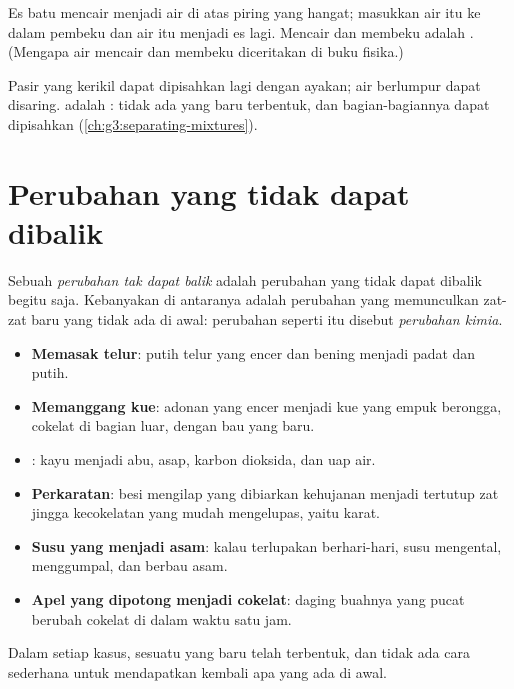 \begin{example}\label{ex:g5:irreversible-changes:ice}
Es batu mencair menjadi air di atas piring yang hangat; masukkan air itu
ke dalam pembeku dan air itu menjadi es lagi. Mencair dan membeku adalah
. (Mengapa air mencair dan membeku diceritakan di
buku fisika.)
\end{example}

\begin{example}[Mencampur]\label{ex:g5:irreversible-changes:mix}
Pasir yang  kerikil dapat dipisahkan lagi dengan ayakan; air
berlumpur dapat disaring.  adalah : tidak
ada yang baru terbentuk, dan bagian-bagiannya dapat dipisahkan
(\cref{ch:g3:separating-mixtures}).
\end{example}

\section{Perubahan yang tidak dapat dibalik}

\begin{definition}\label{def:g5:irreversible-changes:chemical-change}
Sebuah \emph{perubahan tak dapat balik}
adalah perubahan yang tidak dapat dibalik begitu saja. Kebanyakan di
antaranya adalah perubahan yang memunculkan zat-zat baru yang tidak ada
di awal: perubahan seperti itu disebut
\emph{perubahan kimia}.
\end{definition}

\begin{example}\label{ex:g5:irreversible-changes:six}
\begin{itemize}
  \item \textbf{Memasak telur}: putih telur yang encer dan bening
        menjadi padat dan putih.
  \item \textbf{Memanggang kue}: adonan yang encer menjadi kue yang
        empuk berongga, cokelat di bagian luar, dengan bau yang baru.
  \item \textbf{}: kayu menjadi abu, asap, karbon dioksida,
        dan uap air.
  \item \textbf{Perkaratan}: besi mengilap yang dibiarkan kehujanan
        menjadi tertutup zat jingga kecokelatan yang mudah mengelupas,
        yaitu karat.
  \item \textbf{Susu yang menjadi asam}: kalau terlupakan berhari-hari,
        susu mengental, menggumpal, dan berbau asam.
  \item \textbf{Apel yang dipotong menjadi cokelat}: daging buahnya yang
        pucat berubah cokelat di  dalam waktu satu jam.
\end{itemize}
Dalam setiap kasus, sesuatu yang baru telah terbentuk, dan tidak ada
cara sederhana untuk mendapatkan kembali apa yang ada di awal.
\end{example}

